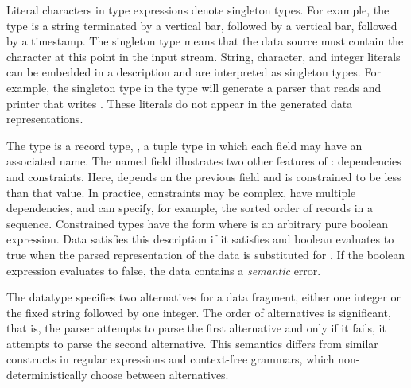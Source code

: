 Literal characters in type expressions denote singleton types.  For
example, the  type is a string terminated by a
vertical bar, followed by a vertical bar, followed by a timestamp.  The
singleton type  means that the data source must contain the
character  at this point in the input stream.
String, character, and integer literals can be embedded in a description and
are interpreted as singleton types.  For example, the singleton type
 in the  type
will generate a parser that reads  and printer that writes .
These literals do not appear in the generated data representations.

The type  is a record type, \ie{}, a tuple type in
which each field may have an associated name.  The named field
 illustrates two other features of
\padsml: dependencies and constraints.  Here, 
depends on the previous field  and is constrained to be
less than that value.  In practice, constraints may be complex, have
multiple dependencies, and can specify, for example, the sorted order
of records in a sequence.  Constrained types have the form \cd{[x:T |
e]} where  is an arbitrary pure boolean expression.  Data
satisfies this description if it satisfies  and boolean 
evaluates to true when the parsed representation of the data is
substituted for .  If the boolean expression evaluates to false,
the data contains a \textit{semantic} error.

The datatype  specifies two
alternatives for a data fragment, either one integer or the fixed
string  followed by one integer.  The order of
alternatives is significant, that is, the parser attempts to parse the
first alternative and only if it fails, it attempts to parse the
second alternative.  This semantics differs from similar constructs in
regular expressions and context-free grammars, which
non-deterministically choose between alternatives.


